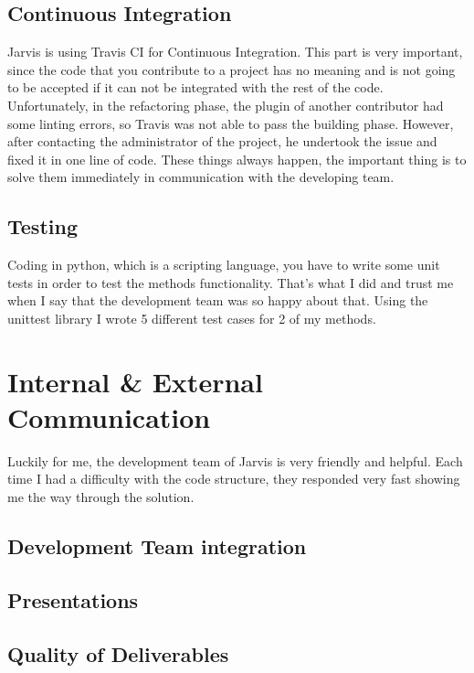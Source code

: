 \documentclass[12pt]{article}
\begin{document}
  \subsection{Continuous Integration}
    
    Jarvis is using Travis CI for Continuous Integration. This part is very important, since the code that you contribute to a project has no meaning and is not going to be accepted if it can not be integrated with the rest of the code. Unfortunately, in the refactoring phase, the plugin of another contributor had some linting errors, so Travis was not able to pass the building phase. However, after contacting the administrator of the project, he undertook the issue and fixed it in one line of code. These things always happen, the important thing is to solve them immediately in communication with the developing team.
      
  \subsection{Testing}
  
    Coding in python, which is a scripting language, you have to write some unit tests in order to test the methods functionality. That's what I did and trust me when I say that the development team was so happy about that. Using the unittest library I wrote 5 different test cases for 2 of my methods.
  
\section{Internal \& External Communication}

    Luckily for me, the development team of Jarvis is very friendly and helpful. Each time I had a difficulty with the code structure, they responded very fast showing me the way through the solution.
 
  \subsection{Development Team integration}
  
  \subsection{Presentations}
  
  \subsection{Quality of Deliverables}
  
\end{document}
